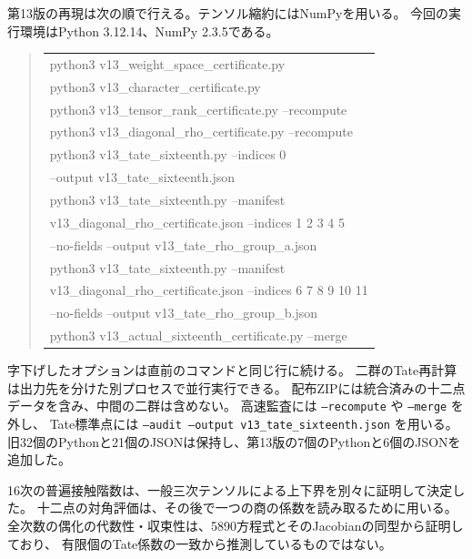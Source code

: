 \documentclass[a4paper,11pt]{ltjsarticle}
\theoremstyle{definition}
\begin{document}
第13版の再現は次の順で行える。テンソル縮約にはNumPyを用いる。
今回の実行環境はPython 3.12.14、NumPy 2.3.5である。
\begin{quote}\footnotesize\ttfamily
\begin{tabular}{@{}l@{}}
python3 v13\_weight\_space\_certificate.py\\
python3 v13\_character\_certificate.py\\
python3 v13\_tensor\_rank\_certificate.py --recompute\\
python3 v13\_diagonal\_rho\_certificate.py --recompute\\
python3 v13\_tate\_sixteenth.py --indices 0\\
\quad --output v13\_tate\_sixteenth.json\\
python3 v13\_tate\_sixteenth.py --manifest\\
\quad v13\_diagonal\_rho\_certificate.json --indices 1 2 3 4 5\\
\quad --no-fields --output v13\_tate\_rho\_group\_a.json\\
python3 v13\_tate\_sixteenth.py --manifest\\
\quad v13\_diagonal\_rho\_certificate.json --indices 6 7 8 9 10 11\\
\quad --no-fields --output v13\_tate\_rho\_group\_b.json\\
python3 v13\_actual\_sixteenth\_certificate.py --merge\\
\end{tabular}
\end{quote}
字下げしたオプションは直前のコマンドと同じ行に続ける。
二群のTate再計算は出力先を分けた別プロセスで並行実行できる。
配布ZIPには統合済みの十二点データを含み、中間の二群は含めない。
高速監査には \texttt{--recompute} や \texttt{--merge} を外し、
Tate標準点には \texttt{--audit --output v13\_tate\_sixteenth.json} を用いる。
旧32個のPythonと21個のJSONは保持し、第13版の7個のPythonと6個のJSONを追加した。

16次の普遍接触階数は、一般三次テンソルによる上下界を別々に証明して決定した。
十二点の対角評価は、その後で一つの商の係数を読み取るために用いる。
全次数の偶化の代数性・収束性は、5890方程式とそのJacobianの同型から証明しており、
有限個のTate係数の一致から推測しているものではない。
\end{document}
